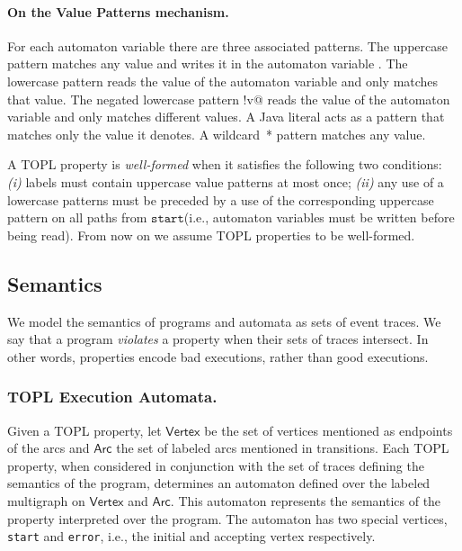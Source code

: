 \documentclass[9pt, preprint]{sigplanconf} %
\newcommand{\set}[1]{\ensuremath{\mathsf{#1}}}
\newcommand{\start}{\ensuremath{\mathtt{start}}\xspace}
\theoremstyle{definition}
\theoremstyle{remark}
\begin{document}
\paragraph{On the Value Patterns mechanism.}
For each automaton variable \Verb@v@ there are three associated patterns.
The uppercase pattern \Verb@V@ matches any value and writes it in the automaton variable \Verb@v@.
The lowercase pattern \Verb@v@ reads the value of the automaton variable \Verb@v@ and only matches that value.
The negated lowercase pattern \Verb@!v@ reads the value of the automaton variable \Verb@v@ and only matches different values.
A Java literal acts as a pattern that matches only the value it denotes.
A wildcard~* pattern matches any value.

\smallskip
A TOPL property is \emph{well-formed} when it satisfies the following two conditions:
{\em (i)} labels must contain uppercase value patterns at most once; {\em (ii)}
any use of a lowercase patterns must be preceded by a use of the corresponding uppercase pattern on all paths from \start  (i.e., automaton variables must be written before being read).
From now on we assume TOPL properties to be well-formed.

\subsection{Semantics}\label{sec:semantics_sub} %
We model the semantics of programs and automata as sets of event traces.
We say that a program \emph{violates} a property when their sets of traces intersect.
In other words, properties encode bad executions, rather than good executions.

\subsubsection{TOPL Execution Automata.}
\newcommand{\World}{ExecState}

Given a TOPL property,  
let $\set{Vertex}$ be the set of vertices mentioned as endpoints of the arcs and $\set{Arc}$ the set of labeled arcs mentioned in transitions.
Each TOPL property, when considered in conjunction with the set of traces defining the semantics of the program, determines  an automaton defined over the labeled multigraph  on $\set{Vertex}$ and $\set{Arc}$.
This automaton represents the semantics of the property interpreted over the program.
The automaton has two special vertices, {\tt start} and {\tt error},  i.e., the initial and accepting vertex respectively.
\end{document}
